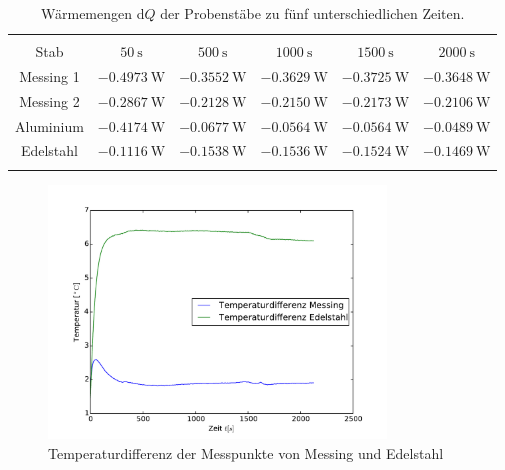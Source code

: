 \begin{table}
	\centering
	\begin{tabular}{cccccc}
	\sisetup{table-format=1.4}\\
	Stab & $50\:\si\second$ & $500\:\si\second$ & $1000\:\si\second$ & $1500\:\si\second$ & $2000\:\si\second$ \\
	\toprule
	Messing 1 &$-0.4973\:\si{\watt}$ &$-0.3552\:\si{\watt}$&$-0.3629\:\si{\watt}$&$-0.3725\:\si{\watt}$&$-0.3648\:\si{\watt}$\\
	Messing 2 &$-0.2867\:\si{\watt}$& $-0.2128\:\si{\watt}$&$-0.2150\:\si{\watt}$&$-0.2173\:\si{\watt}$&$-0.2106\:\si{\watt}$\\
	Aluminium &$-0.4174\:\si{\watt}$&$-0.0677\:\si{\watt}$&$-0.0564\:\si{\watt}$&$-0.0564\:\si{\watt}$&$-0.0489\:\si{\watt}$\\
	Edelstahl &$-0.1116\:\si{\watt}$&$-0.1538\:\si{\watt}$&$-0.1536\:\si{\watt}$&$-0.1524\:\si{\watt}$&$-0.1469\:\si{\watt}$\\
	\bottomrule
	\label{tab:waememengen}
	\end{tabular}
	\caption{Wärmemengen d$Q$ der Probenstäbe zu fünf unterschiedlichen Zeiten.}
\end{table}
\begin{figure}[htp]
	\label{fig:tempverl}
	\centering
	\includegraphics[width=0.8\textwidth]{Bilder/M1_Tempdiff.pdf}
	\caption{Temperaturdifferenz der Messpunkte von Messing und Edelstahl}
\end{figure}

